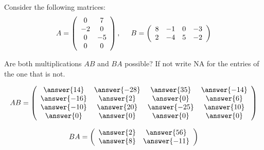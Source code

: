 \documentclass{ximera}
\author{Parisa Fatheddin}
\begin{document}
\begin{exercise}

Consider the following matrices:
\begin{equation*}
A = \left(\begin{array}{cc}
0 & 7\\
-2 & 0\\
0 & -5 \\
0 & 0
\end{array}\right), \hspace{.5cm} B = \left(\begin{array}{cccc}
8 & -1 & 0 & -3\\
2 & -4 & 5 & -2
\end{array}\right)
\end{equation*}

Are both multiplications $AB$ and $BA$ possible? If not write NA for the entries of the one that is not.

\begin{prompt}
\begin{equation*}
AB = \left(\begin{array}{cccc}
\answer{14} & \answer{-28} & \answer{35} & \answer{-14}\\
\answer{-16} & \answer{2} & \answer{0} & \answer{6}\\
\answer{-10} & \answer{20} & \answer{-25} & \answer{10}\\
\answer{0} & \answer{0} & \answer{0} & \answer{0}
\end{array}\right)
\end{equation*}

\begin{equation*}
BA = \left(\begin{array}{cc}
\answer{2} & \answer{56}\\
\answer{8} & \answer{-11}
\end{array}\right)
\end{equation*}
\end{prompt}































\end{exercise}
\end{document}

